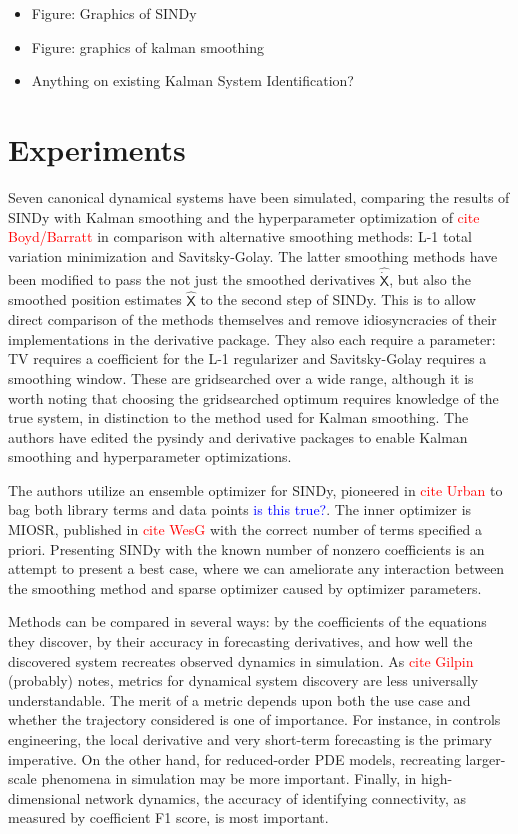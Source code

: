 \documentclass{article}
\newcommand{\red}[1]{\textcolor{red}{#1}}
\newcommand{\blue}[1]{\textcolor{blue}{#1}}
\newcommand{\mat}[1]{\boldsymbol{\mathsf{#1}}}
\begin{document}
\begin{itemize}
    \item Figure: Graphics of SINDy
    \item Figure: graphics of kalman smoothing
    \item Anything on existing Kalman System Identification?
\end{itemize}

\section{Experiments}

Seven canonical dynamical systems have been simulated, comparing the results of SINDy with Kalman smoothing and the hyperparameter optimization of \red{cite Boyd/Barratt} in comparison with alternative smoothing methods: L-1 total variation minimization and Savitsky-Golay.  The latter smoothing methods have been modified to pass the not just the smoothed derivatives $\mat{\widehat{\dot X}}$, but also the smoothed position estimates $\mat {\widehat X}$ to the second step of SINDy.  This is to allow direct comparison of the methods themselves and remove idiosyncracies of their implementations in the derivative package.  They also each require a parameter: TV requires a coefficient for the L-1 regularizer and Savitsky-Golay requires a smoothing window.  These are gridsearched over a wide range, although it is worth noting that choosing the gridsearched optimum requires knowledge of the true system, in distinction to the method used for Kalman smoothing.  The authors have edited the pysindy and derivative packages to enable Kalman smoothing and hyperparameter optimizations.

The authors utilize an ensemble optimizer for SINDy, pioneered in \red{cite Urban} to bag both library terms and data points \blue{is this true?}.  The inner optimizer is MIOSR, published in \red{cite WesG} with the correct number of terms specified a priori.  Presenting SINDy with the known number of nonzero coefficients is an attempt to present a best case, where we can ameliorate any interaction between the smoothing method and sparse optimizer caused by optimizer parameters. 

Methods can be compared in several ways: by the coefficients of the equations they discover, by their accuracy in forecasting derivatives, and how well the discovered system recreates observed dynamics in simulation.  As \red{cite Gilpin} (probably) notes,  metrics for dynamical system discovery are less universally understandable.  The merit of a metric depends upon both the use case and whether the trajectory considered is one of importance.  For instance, in controls engineering, the local derivative and very short-term forecasting is the primary imperative.  On the other hand, for reduced-order PDE models, recreating larger-scale phenomena in simulation may be more important.  Finally, in high-dimensional network dynamics, the accuracy of identifying connectivity, as measured by coefficient F1 score, is most important.
\end{document}
